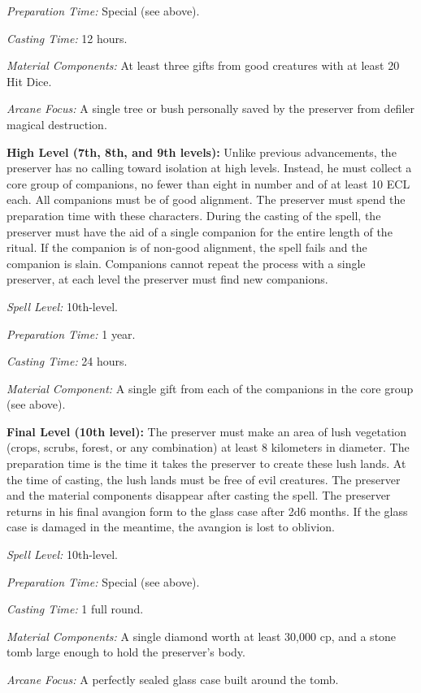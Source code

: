 {\textit{Preparation Time:} Special (see above).

\textit{Casting Time:} 12 hours.

\textit{Material Components:} At least three gifts from good creatures with at least 20 Hit Dice.

\textit{Arcane Focus:} A single tree or bush personally saved by the preserver from defiler magical destruction.

\textbf{High Level (7th, 8th, and 9th levels):} Unlike previous advancements, the preserver has no calling toward isolation at high levels. Instead, he must collect a core group of companions, no fewer than eight in number and of at least 10 ECL each. All companions must be of good alignment. The preserver must spend the preparation time with these characters. During the casting of the spell, the preserver must have the aid of a single companion for the entire length of the ritual. If the companion is of non-good alignment, the spell fails and the companion is slain. Companions cannot repeat the process with a single preserver, at each level the preserver must find new companions.

\textit{Spell Level:} 10th-level.

\textit{Preparation Time:} 1 year.

\textit{Casting Time:} 24 hours.

\textit{Material Component:} A single gift from each of the companions in the core group (see above).

\textbf{Final Level (10th level):} The preserver must make an area of lush vegetation (crops, scrubs, forest, or any combination) at least 8 kilometers in diameter. The preparation time is the time it takes the preserver to create these lush lands. At the time of casting, the lush lands must be free of evil creatures. The preserver and the material components disappear after casting the spell. The preserver returns in his final avangion form to the glass case after 2d6 months. If the glass case is damaged in the meantime, the avangion is lost to oblivion.

\textit{Spell Level:} 10th-level.

\textit{Preparation Time:} Special (see above).

\textit{Casting Time:} 1 full round.

\textit{Material Components:} A single diamond worth at least 30,000 cp, and a stone tomb large enough to hold the preserver's body.

\textit{Arcane Focus:} A perfectly sealed glass case built around the tomb.
}